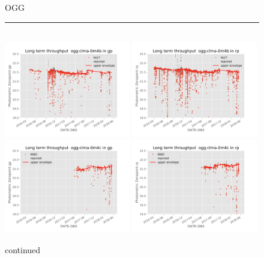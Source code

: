 \documentclass[]{spie}
\begin{document}
\begin{figure}
OGG  \\ 
\rule{\textwidth}{0.4pt} \\
\includegraphics[width=0.49\textwidth]{images/photzptrend-ogg-clma-0m4b-gp.png} \hspace*{\fill}
\includegraphics[width=0.49\textwidth]{images/photzptrend-ogg-clma-0m4b-rp.png} \\
\includegraphics[width=0.49\textwidth]{images/photzptrend-ogg-clma-0m4c-gp.png} \hspace*{\fill}
\includegraphics[width=0.49\textwidth]{images/photzptrend-ogg-clma-0m4c-rp.png} \\[1ex]
\caption {continued}
\end{figure}
\end{document}
